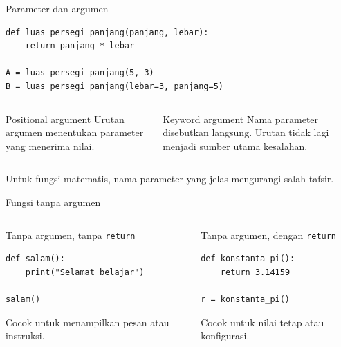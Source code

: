 \documentclass[aspectratio=169,11pt]{beamer}
\begin{document}
\begin{frame}[fragile]{Parameter dan argumen}
\begin{lstlisting}
def luas_persegi_panjang(panjang, lebar):
    return panjang * lebar

A = luas_persegi_panjang(5, 3)
B = luas_persegi_panjang(lebar=3, panjang=5)
\end{lstlisting}
\begin{columns}[T]
\begin{block}{Positional argument}
Urutan argumen menentukan parameter yang menerima nilai.
\end{block}
\begin{block}{Keyword argument}
Nama parameter disebutkan langsung. Urutan tidak lagi menjadi sumber utama kesalahan.
\end{block}
\end{columns}
\vspace{1mm}
\small Untuk fungsi matematis, nama parameter yang jelas mengurangi salah tafsir.
\end{frame}

\begin{frame}[fragile]{Fungsi tanpa argumen}
\begin{columns}[T]
\begin{block}{Tanpa argumen, tanpa \texttt{return}}
\begin{lstlisting}
def salam():
    print("Selamat belajar")

salam()
\end{lstlisting}
Cocok untuk menampilkan pesan atau instruksi.
\end{block}
\begin{block}{Tanpa argumen, dengan \texttt{return}}
\begin{lstlisting}
def konstanta_pi():
    return 3.14159

r = konstanta_pi()
\end{lstlisting}
Cocok untuk nilai tetap atau konfigurasi.
\end{block}
\end{columns}
\end{frame}
\end{document}
